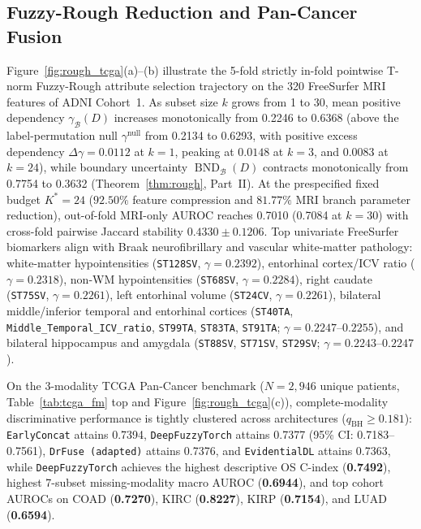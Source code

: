 \documentclass[10pt,twocolumn]{article}
\begin{document}
\subsection{Fuzzy-Rough Reduction and Pan-Cancer Fusion}
Figure~\ref{fig:rough_tcga}(a)--(b) illustrate the 5-fold strictly in-fold pointwise T-norm
Fuzzy-Rough attribute selection trajectory on the 320 FreeSurfer MRI features of ADNI Cohort~1.
As subset size $k$ grows from 1 to 30, mean positive dependency $\gamma_{\mathcal{B}}(D)$
increases monotonically from 0.2246 to 0.6368 (above the label-permutation null
$\gamma^{\text{null}}$ from 0.2134 to 0.6293, with positive excess dependency $\Delta\gamma =
0.0112$ at $k=1$, peaking at $0.0148$ at $k=3$, and $0.0083$ at $k=24$), while boundary
uncertainty $\operatorname{BND}_{\mathcal{B}}(D)$ contracts monotonically from 0.7754 to 0.3632
(Theorem~\ref{thm:rough}, Part~II). At the prespecified fixed budget $K^*=24$ ($92.50\%$
feature compression and $81.77\%$ MRI branch parameter reduction), out-of-fold MRI-only AUROC
reaches 0.7010 (0.7084 at $k=30$) with cross-fold pairwise Jaccard stability $0.4330 \pm
0.1206$. Top univariate FreeSurfer biomarkers align with Braak neurofibrillary and vascular
white-matter pathology: white-matter hypointensities (\texttt{ST128SV}, $\gamma=0.2392$),
entorhinal cortex/ICV ratio ($\gamma=0.2318$), non-WM hypointensities (\texttt{ST68SV},
$\gamma=0.2284$), right caudate (\texttt{ST75SV}, $\gamma=0.2261$), left entorhinal volume
(\texttt{ST24CV}, $\gamma=0.2261$), bilateral middle/inferior temporal and entorhinal cortices
(\texttt{ST40TA}, \texttt{Middle\_Temporal\_ICV\_ratio}, \texttt{ST99TA}, \texttt{ST83TA},
\texttt{ST91TA}; $\gamma=0.2247\text{--}0.2255$), and bilateral hippocampus and amygdala
(\texttt{ST88SV}, \texttt{ST71SV}, \texttt{ST29SV}; $\gamma=0.2243\text{--}0.2247$).

On the 3-modality TCGA Pan-Cancer benchmark ($N=2,946$ unique patients, Table~\ref{tab:tcga_fm}
top and Figure~\ref{fig:rough_tcga}(c)), complete-modality discriminative performance is
tightly clustered across architectures ($q_{\text{BH}} \ge 0.181$): \texttt{EarlyConcat}
attains 0.7394, \texttt{DeepFuzzyTorch} attains 0.7377 (95\%
CI: 0.7183--0.7561), \texttt{DrFuse (adapted)} attains 0.7376, and \texttt{EvidentialDL}
attains 0.7363, while \texttt{DeepFuzzyTorch} achieves the highest descriptive OS C-index
(\textbf{0.7492}), highest 7-subset missing-modality macro AUROC (\textbf{0.6944}), and top
cohort AUROCs on COAD (\textbf{0.7270}), KIRC (\textbf{0.8227}), KIRP (\textbf{0.7154}), and
LUAD (\textbf{0.6594}).
\end{document}
